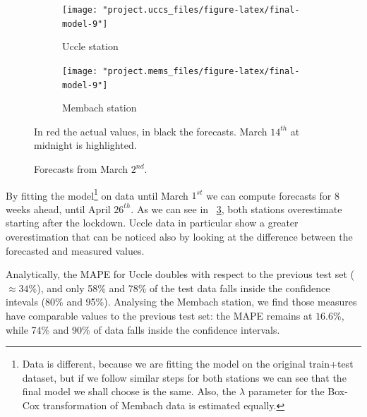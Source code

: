 \documentclass[12pt]{article}
\begin{document}
\begin{figure}[h]
	\begin{subfigure}{.5\linewidth}
		\texttt{[image: "project.uccs\_files/figure-latex/final-model-9"]}
		\caption{Uccle station}
		\label{fig:forecast.lockdown:uccs}
	\end{subfigure}
	\begin{subfigure}{.5\linewidth}
		\texttt{[image: "project.mems\_files/figure-latex/final-model-9"]}
		\caption{Membach station}
		\label{fig:forecast.lockdown:mems}
	\end{subfigure}
	\caption{Forecasts from March $2^{nd}$.}{\centering\small In red the actual values, in black the forecasts. March $14^{th}$ at midnight is highlighted.\\}
	\label{fig:forecast.lockdown}
\end{figure}
%
By fitting the model\footnote{Data is different, because we are fitting the model on the original train+test dataset, but if we follow similar steps for both stations we can see that the final model we shall choose is the same. Also, the $\lambda$ parameter for the Box-Cox transformation of Membach data is estimated equally.} on data until March $1^{st}$ we can compute forecasts for 8 weeks ahead, until April $26^{th}$. As we can see in \figurename~\ref{fig:forecast.lockdown}, both stations overestimate starting after the lockdown. Uccle data in particular show a greater overestimation that can be noticed also by looking at the difference between the forecasted and measured values.

Analytically, the MAPE for Uccle doubles with respect to the previous test set ($\approx34\%$), and only 58\% and 78\% of the test data falls inside the confidence intevals (80\% and 95\%). Analysing the Membach station, we find those measures have comparable values to the previous test set: the MAPE remains at $16.6\%$, while 74\% and 90\% of data falls inside the confidence intervals.





\end{document}
